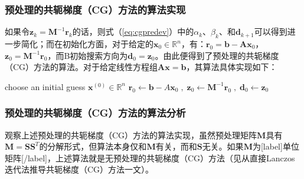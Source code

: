 \documentclass[12pt, UTF8, nofonts]{ctexart}
\begin{document}
\subsubsection*{预处理的共轭梯度（CG）方法的算法实现}

如果令$\boldsymbol{z}_{k}=\boldsymbol{M}^{-1}\boldsymbol{r}_k$的话，则式（\ref{eq:cgpredev}）中的$\alpha_k$、$\beta_k$、和$\boldsymbol{d}_{k+1}$可以得到进一步简化；而在初始化方面，对于给定的$\boldsymbol{x}_0\in\mathbb{R}^n$，有：$\boldsymbol{r}_0=\boldsymbol{b}-\boldsymbol{Ax}_0$，$\boldsymbol{z}_0=\boldsymbol{M}^{-1}\boldsymbol{r}_0$，而B初始搜索方向为$\boldsymbol{d}_0=\boldsymbol{z}_0$。由此便得到了预处理的共轭梯度（CG）方法的算法。对于给定线性方程组$\boldsymbol{Ax}=\boldsymbol{b}$，其算法具体实现如下：

\begin{algorithm}[H]
    choose an initial guess $\boldsymbol{x}^{(0)}\in\mathbb{R}^{n}$ \;
    $\boldsymbol{r}_0 \gets \boldsymbol{b}-A\boldsymbol{x}_0 \;,\; \boldsymbol{z}_0 \gets \boldsymbol{M}^{-1}\boldsymbol{r}_0 \;,\; \boldsymbol{d}_0 \gets \boldsymbol{z}_0$ \;
\end{algorithm}

\subsubsection*{预处理的共轭梯度（CG）方法的算法分析}

观察上述预处理的共轭梯度（CG）方法的算法实现，虽然预处理矩阵$\boldsymbol{M}$具有$\boldsymbol{M}=\boldsymbol{SS}^T$的分解形式，但算法本身仅和$\boldsymbol{M}$有关，而和$\boldsymbol{S}$无关。如果$\boldsymbol{M}$为[label]单位矩阵[/label]，上述算法就是无预处理的共轭梯度（CG）方法（见从直接Lanczos迭代法推导共轭梯度（CG）方法一文）。
\end{document}
